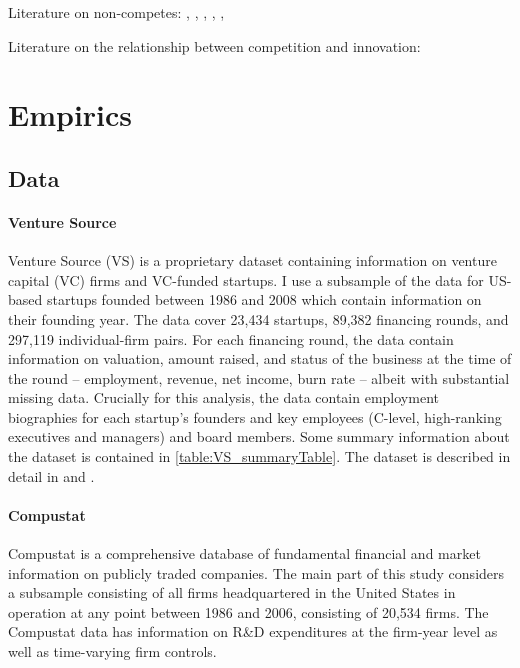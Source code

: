 \documentclass[12pt,english]{article}
\theoremstyle{remark}
\begin{document}
Literature on non-competes: \cite{saxenian_regional_1994}, \cite{gilson_legal_1999}, \cite{jeffers_impact_2018}, \cite{marx_mobility_2009}, \cite{marx_regional_2015}, \cite{starr_noncompetes_2019}

Literature on the relationship between competition and innovation: \cite{aghion_competition_2005}


\section{Empirics}

\subsection{Data}

\paragraph{Venture Source}

Venture Source (VS) is a proprietary dataset containing information on venture capital (VC) firms and VC-funded startups. I use a subsample of the data for US-based startups founded between 1986 and 2008 which contain information on their founding year. The data cover 23,434 startups, 89,382 financing rounds, and 297,119 individual-firm pairs. For each financing round, the data contain information on valuation, amount raised, and status of the business at the time of the round -- employment, revenue, net income, burn rate -- albeit with substantial missing data. Crucially for this analysis, the data contain employment biographies for each startup's founders and key employees (C-level, high-ranking executives and managers) and board members. Some summary information about the dataset is contained in \autoref{table:VS_summaryTable}. The dataset is described in detail in \cite{kaplan_how_2002} and \cite{kaplan_venture_2016}. 

\paragraph{Compustat}

Compustat is a comprehensive database of fundamental financial and market information on publicly traded companies. The main part of this study considers a subsample consisting of all firms headquartered in the United States in operation at any point between 1986 and 2006, consisting of 20,534 firms. The Compustat data has information on R\&D expenditures at the firm-year level as well as time-varying firm controls.
\end{document}
